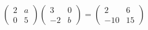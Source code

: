 $\begin{pmatrix} 2 & a \\ 0 & 5 \end{pmatrix}\begin{pmatrix} 3 & 0 \\ -2 & b \end{pmatrix}=\begin{pmatrix} 2 & 6 \\ -10 & 15 \end{pmatrix}$
